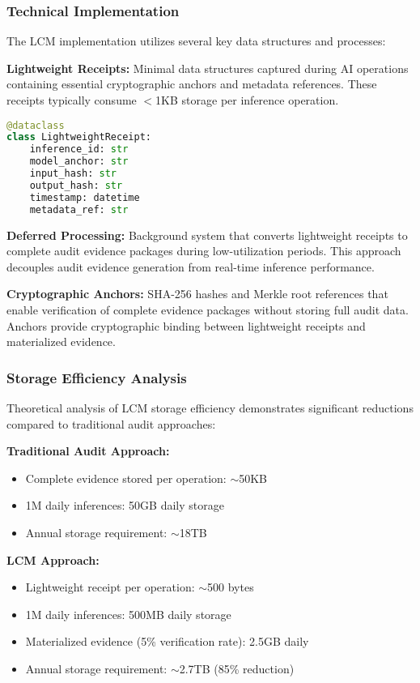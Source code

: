 \documentclass[12pt,a4paper]{article}
\begin{document}
\subsubsection{Technical Implementation}

The LCM implementation utilizes several key data structures and processes:

\textbf{Lightweight Receipts:} Minimal data structures captured during AI operations containing essential cryptographic anchors and metadata references. These receipts typically consume $<$1KB storage per inference operation.

\begin{lstlisting}[language=Python, caption=Lightweight Receipt Data Structure]
@dataclass
class LightweightReceipt:
    inference_id: str
    model_anchor: str
    input_hash: str
    output_hash: str
    timestamp: datetime
    metadata_ref: str
\end{lstlisting}

\textbf{Deferred Processing:} Background system that converts lightweight receipts to complete audit evidence packages during low-utilization periods. This approach decouples audit evidence generation from real-time inference performance.

\textbf{Cryptographic Anchors:} SHA-256 hashes and Merkle root references that enable verification of complete evidence packages without storing full audit data. Anchors provide cryptographic binding between lightweight receipts and materialized evidence.

\subsubsection{Storage Efficiency Analysis}

Theoretical analysis of LCM storage efficiency demonstrates significant reductions compared to traditional audit approaches:

\textbf{Traditional Audit Approach:}
\begin{itemize}
\item Complete evidence stored per operation: $\sim$50KB
\item 1M daily inferences: 50GB daily storage
\item Annual storage requirement: $\sim$18TB
\end{itemize}

\textbf{LCM Approach:}
\begin{itemize}
\item Lightweight receipt per operation: $\sim$500 bytes
\item 1M daily inferences: 500MB daily storage
\item Materialized evidence (5\% verification rate): 2.5GB daily
\item Annual storage requirement: $\sim$2.7TB (85\% reduction)
\end{itemize}
\end{document}
